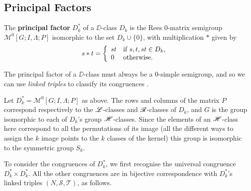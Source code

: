 \subsection{Principal Factors}
\label{sec:principal}

\begin{definition}
\label{def:principalfactor}
The \textbf{principal factor} $D_k^*$ of a $\DD$-class $D_k$ is the Rees
0-matrix semigroup $\mathcal{M}^0[G;I,\Lambda;P]$ isomorphic to the set $D_k \cup
\{0\}$, with multiplication $*$ given by
$$s * t = \left\{
  \begin{array}{l l}
    st & \text{if~} s,t,st \in D_k, \\
    0 & \text{otherwise}.
  \end{array}\right.$$
\end{definition}

The principal factor of a $\DD$-class must always be a 0-simple
semigroup, and so we can use \textit{linked triples} to classify its
congruences \cite[3.5]{howie}.

Let $D_k^* = \mathcal{M}^0[G;I,\Lambda;P]$ as above.
The rows and columns of the matrix $P$ correspond respectively to the $\mathrel{\mathscr{L}}$-classes and
$\mathrel{\mathscr{R}}$-classes of $D_k$, and $G$ is the group isomorphic to each of $D_k$'s group
$\mathrel{\mathscr{H}}$-classes.  Since the elements of an $\mathrel{\mathscr{H}}$-class here correspond to all the permutations
of its image (all the different ways to assign the $k$ image points to the $k$
classes of the kernel) this group is isomorphic to the symmetric group $S_k$.

To consider the congruences of $D_k^*$, we first recognise the universal
congruence $D_k^* \times D_k^*$.  All the other congruences are in bijective
correspondence with $D_k^*$'s linked triples $(N,\mathcal{S},\mathcal{T})$, as
follows.

